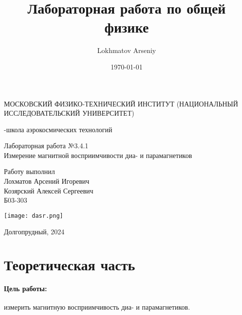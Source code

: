 \documentclass[a4paper,12pt]{article} %
\author{Lokhmatov Arseniy}
\title{Лабораторная работа по общей физике}
\date{\today}
\begin{document}
\begin{titlepage}
    \newpage
    \begin{center}
    {\large МОСКОВСКИЙ ФИЗИКО-ТЕХНИЧЕСКИЙ ИНСТИТУТ (НАЦИОНАЛЬНЫЙ ИССЛЕДОВАТЕЛЬСКИЙ УНИВЕРСИТЕТ)}
    \vspace{1cm}

    {-школа аэрокосмических технологий}
    \vspace{6em}
    \end{center}
    
    \vspace{1.2em}

    \begin{center}
    \Large Лабораторная работа №3.4.1 \\
    Измерение магнитной восприимчивости диа- и парамагнетиков 
    \linebreak
    \end{center}
    
    \vspace{11em}
    
    \begin{flushright}
                       {\large Работу выполнил\\
                       Лохматов Арсений Игоревич\\
                       Козярский Алексей Сергеевич\\
                       Б03-303 }
    \end{flushright}

    \vspace{\fill}

    \begin{center}
        \texttt{[image: dasr.png]}
    \end{center}

    \begin{center}
    Долгопрудный, 2024
    \end{center}

    \end{titlepage}

\section{Теоретическая часть}

\paragraph{Цель работы:} измерить магнитную восприимчивость диа- и парамагнетиков.
\end{document}
